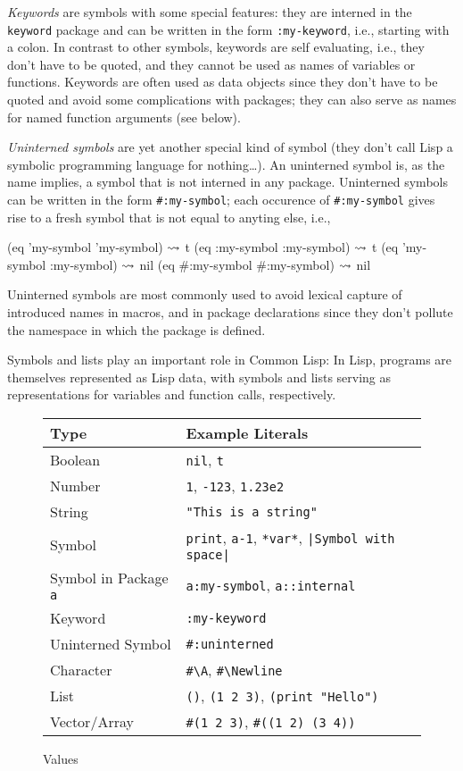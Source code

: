 \documentclass[a4paper]{amsart}
\begin{document}
\emph{Keywords} are symbols with some special features: they are
interned in the \texttt{keyword} package and can be written in the
form \texttt{:my-keyword}, i.e., starting with a colon.  In contrast
to other symbols, keywords are self evaluating, i.e., they don't have
to be quoted, and they cannot be used as names of variables or
functions.  Keywords are often used as data objects since they don't
have to be quoted and avoid some complications with packages; they
can also serve as names for named function arguments (see below).

\emph{Uninterned symbols} are yet another special kind of symbol (they
don't call Lisp a symbolic programming language for nothing\dots).  An
uninterned symbol is, as the name implies, a symbol that is not
interned in any package.  Uninterned symbols can be written in the
form \verb|#:my-symbol|; each occurence of \verb|#:my-symbol| gives
rise to a fresh symbol that is not equal to anyting else, i.e.,
\begin{Code}
  (eq 'my-symbol 'my-symbol)      $\rightsquigarrow$ t
  (eq :my-symbol :my-symbol)      $\rightsquigarrow$ t  
  (eq 'my-symbol :my-symbol)      $\rightsquigarrow$ nil  
  (eq #:my-symbol #:my-symbol)    $\rightsquigarrow$ nil 
\end{Code}
Uninterned symbols are most commonly used to avoid lexical capture of
introduced names in macros, and in package declarations since they
don't pollute the namespace in which the package is defined.

Symbols and lists play an important role in Common Lisp: In Lisp,
programs are themselves represented as Lisp data, with symbols and
lists serving as representations for variables and function calls,
respectively.

\begin{figure}[tp]
  \centering
  \begin{tabular}{|l|l|}
    \hline
    Type& Example Literals\\
    \hline\hline
    Boolean & \texttt{nil}, \texttt{t}\\
    \hline
    Number & \texttt{1}, \texttt{-123}, \texttt{1.23e2}\\
    \hline
    String & \verb|"This is a string"|\\
    \hline
    Symbol & \verb|print|, \verb|a-1|, \verb|*var*|, \verb=|Symbol with space|=\\
    \hline
    Symbol in Package \texttt{a} & \verb|a:my-symbol|, \verb|a::internal|\\
    \hline
    Keyword & \verb|:my-keyword|\\
    \hline
    Uninterned Symbol & \verb|#:uninterned|\\
    \hline
    Character & \verb|#\A|, \verb|#\Newline|\\
    \hline
    List & \verb|()|, \verb|(1 2 3)|, \verb|(print "Hello")|\\
    \hline
    Vector/Array & \verb|#(1 2 3)|, \verb|#((1 2) (3 4))|\\
    \hline
  \end{tabular}
  \caption{Values}
  \label{fig:value-literals}
\end{figure}
\end{document}
